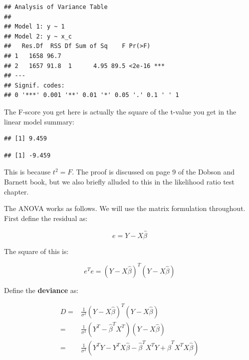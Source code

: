 \documentclass[
  12pt,
]{krantz}
\newenvironment{Shaded}{\begin{snugshade}}{\end{snugshade}}
\newcommand{\DecValTok}[1]{\textcolor[rgb]{0.00,0.00,0.81}{#1}}
\newcommand{\FunctionTok}[1]{\textcolor[rgb]{0.00,0.00,0.00}{#1}}
\newcommand{\NormalTok}[1]{#1}
\newcommand{\SpecialCharTok}[1]{\textcolor[rgb]{0.00,0.00,0.00}{#1}}
\theoremstyle{definition}
\theoremstyle{definition}
\theoremstyle{definition}
\theoremstyle{definition}
\theoremstyle{remark}
\begin{document}
\begin{verbatim}
## Analysis of Variance Table
## 
## Model 1: y ~ 1
## Model 2: y ~ x_c
##   Res.Df  RSS Df Sum of Sq    F Pr(>F)    
## 1   1658 96.7                             
## 2   1657 91.8  1      4.95 89.5 <2e-16 ***
## ---
## Signif. codes:  
## 0 '***' 0.001 '**' 0.01 '*' 0.05 '.' 0.1 ' ' 1
\end{verbatim}

The F-score you get here is actually the square of the t-value you get in the linear model summary:

\begin{Shaded}
\end{Shaded}

\begin{verbatim}
## [1] 9.459
\end{verbatim}

\begin{Shaded}
\end{Shaded}

\begin{verbatim}
## [1] -9.459
\end{verbatim}

This is because \(t^2 = F\). The proof is discussed on page 9 of the Dobson and Barnett book, but we also briefly alluded to this in the likelihood ratio test chapter.

The ANOVA works as follows. We will use the matrix formulation throughout. First define the residual as:

\begin{equation}
e = Y - X\hat\beta
\end{equation}

The square of this is:

\begin{equation}
e^T e = (Y - X\hat \beta)^T (Y - X\hat \beta)
\end{equation}

Define the \textbf{deviance} as:

\begin{equation}
\begin{split} \label{eq:deviance}
D =& \frac{1}{\sigma^2} (Y - X\hat \beta)^T (Y - X\hat \beta)\\
=& \frac{1}{\sigma^2}  (Y^T - \hat \beta^TX^T)(Y - X\hat \beta)\\
=& \frac{1}{\sigma^2} (Y^T Y - Y^TX\hat \beta - \hat\beta^TX^T Y + \hat\beta^TX^T  X\hat \beta)\\
\end{split}
\end{equation}
\end{document}
